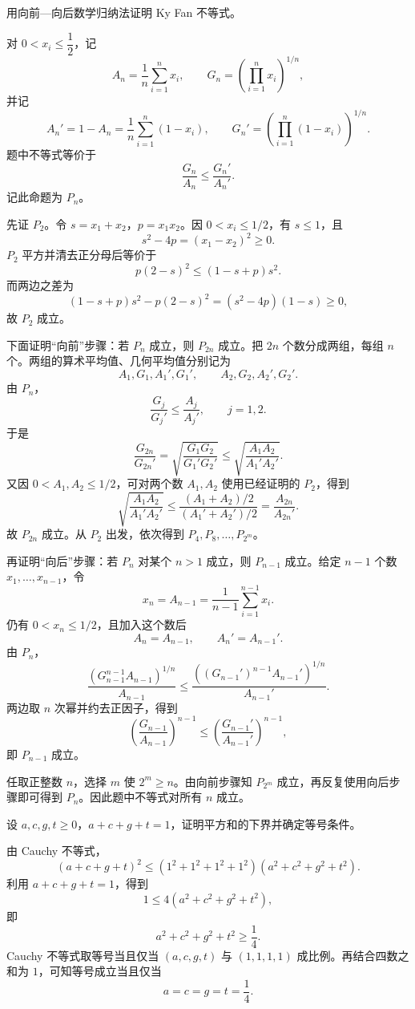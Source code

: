 \begin{xexercise}[7]
用向前—向后数学归纳法证明 Ky Fan 不等式。
\end{xexercise}
\begin{xsolution}
对 $0<x_i\le\dfrac12$，记
\[
  A_n=\frac1n\sum_{i=1}^n x_i,
  \qquad
  G_n=\left(\prod_{i=1}^n x_i\right)^{1/n},
\]
并记
\[
  A_n'=1-A_n=\frac1n\sum_{i=1}^n(1-x_i),
  \qquad
  G_n'=\left(\prod_{i=1}^n(1-x_i)\right)^{1/n}.
\]
题中不等式等价于
\[
  \frac{G_n}{A_n}\le\frac{G_n'}{A_n'}.
\]
记此命题为 $P_n$。

先证 $P_2$。令 $s=x_1+x_2$，$p=x_1x_2$。因 $0<x_i\le1/2$，有 $s\le1$，且
\[
  s^2-4p=(x_1-x_2)^2\ge0.
\]
$P_2$ 平方并清去正分母后等价于
\[
  p(2-s)^2\le(1-s+p)s^2.
\]
而两边之差为
\[
  (1-s+p)s^2-p(2-s)^2
  =(s^2-4p)(1-s)\ge0,
\]
故 $P_2$ 成立。

下面证明“向前”步骤：若 $P_n$ 成立，则 $P_{2n}$ 成立。把 $2n$ 个数分成两组，每组 $n$ 个。两组的算术平均值、几何平均值分别记为
\[
  A_1,G_1,A_1',G_1',
  \qquad
  A_2,G_2,A_2',G_2'.
\]
由 $P_n$，
\[
  \frac{G_j}{G_j'}\le\frac{A_j}{A_j'},\qquad j=1,2.
\]
于是
\[
  \frac{G_{2n}}{G_{2n}'}
  =\sqrt{\frac{G_1G_2}{G_1'G_2'}}
  \le\sqrt{\frac{A_1A_2}{A_1'A_2'}}.
\]
又因 $0<A_1,A_2\le1/2$，可对两个数 $A_1,A_2$ 使用已经证明的 $P_2$，得到
\[
  \sqrt{\frac{A_1A_2}{A_1'A_2'}}
  \le\frac{(A_1+A_2)/2}{(A_1'+A_2')/2}
  =\frac{A_{2n}}{A_{2n}'}.
\]
故 $P_{2n}$ 成立。从 $P_2$ 出发，依次得到 $P_4,P_8,\ldots,P_{2^m}$。

再证明“向后”步骤：若 $P_n$ 对某个 $n>1$ 成立，则 $P_{n-1}$ 成立。给定 $n-1$ 个数 $x_1,\ldots,x_{n-1}$，令
\[
  x_n=A_{n-1}=\frac1{n-1}\sum_{i=1}^{n-1}x_i.
\]
仍有 $0<x_n\le1/2$，且加入这个数后
\[
  A_n=A_{n-1},\qquad A_n'=A_{n-1}'.
\]
由 $P_n$，
\[
  \frac{(G_{n-1}^{n-1}A_{n-1})^{1/n}}{A_{n-1}}
  \le
  \frac{((G_{n-1}')^{n-1}A_{n-1}')^{1/n}}{A_{n-1}'}.
\]
两边取 $n$ 次幂并约去正因子，得到
\[
  \left(\frac{G_{n-1}}{A_{n-1}}\right)^{n-1}
  \le
  \left(\frac{G_{n-1}'}{A_{n-1}'}\right)^{n-1},
\]
即 $P_{n-1}$ 成立。

任取正整数 $n$，选择 $m$ 使 $2^m\ge n$。由向前步骤知 $P_{2^m}$ 成立，再反复使用向后步骤即可得到 $P_n$。因此题中不等式对所有 $n$ 成立。
\end{xsolution}

\begin{xexercise}[8]
设 $a,c,g,t\ge0$，$a+c+g+t=1$，证明平方和的下界并确定等号条件。
\end{xexercise}
\begin{xsolution}
由 Cauchy 不等式，
\[
  (a+c+g+t)^2
  \le(1^2+1^2+1^2+1^2)(a^2+c^2+g^2+t^2).
\]
利用 $a+c+g+t=1$，得到
\[
  1\le4(a^2+c^2+g^2+t^2),
\]
即
\[
  a^2+c^2+g^2+t^2\ge\frac14.
\]
Cauchy 不等式取等号当且仅当 $(a,c,g,t)$ 与 $(1,1,1,1)$ 成比例。再结合四数之和为 $1$，可知等号成立当且仅当
\[
  a=c=g=t=\frac14.
\]
\end{xsolution}

